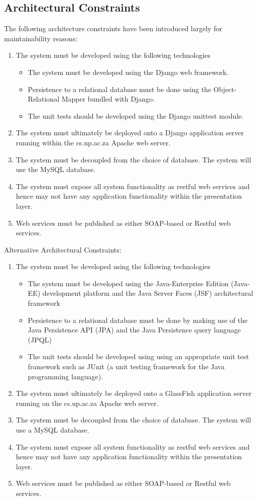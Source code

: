 \documentclass[12pt, oneside]{article}
\begin{document}
	\subsection{Architectural Constraints}		
	The following architecture constraints have been introduced largely for maintainability reasons:
\begin{enumerate}
	\item The system must be developed using the following technologies
	\begin{itemize}
		\item The system must be developed using the Django web framework.
		\item Persistence to a relational database must be done using the Object-Relational Mapper bundled with Django.
		\item The unit tests should be developed using the Django unittest module.
	\end{itemize}

	\item The system must ultimately be deployed onto a Django application server running within the cs.up.ac.za Apache web server.
	\item The system must be decoupled from the choice of database. The system will use the MySQL database.
	\item The system must expose all system functionality as restful web services and hence may not have any application functionality within the presentation layer.
	\item Web services must be published as either SOAP-based or Restful web services.
\end{enumerate}

Alternative Architectural Constraints:
\begin{enumerate}
	\item The system must be developed using the following technologies
	\begin{itemize}
		\item The system must be developed using the Java-Enterprise Edition (Java-EE) development platform and the Java Server Faces (JSF) architectural framework
		\item Persistence to a relational database must be done by making use of the Java Persistence API (JPA) and the Java Persistence query language (JPQL)
		\item The unit tests should be developed using using an appropriate unit test framework such as JUnit (a unit testing framework for the Java programming language).
	\end{itemize}

	\item The system must ultimately be deployed onto a GlassFish application server running on the cs.up.ac.za Apache web server.
	\item The system must be decoupled from the choice of database. The system will use a MySQL database.
	\item The system must expose all system functionality as restful web services and hence may not have any application functionality within the presentation layer.
	\item Web services must be published as either SOAP-based or Restful web services.
\end{enumerate}
\end{document}

